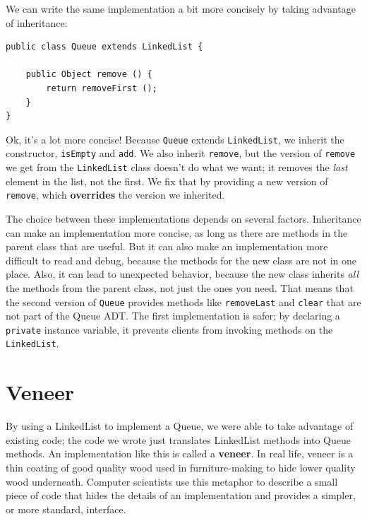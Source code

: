 \documentclass[12pt]{book}
\theoremstyle{exercise}
\begin{document}
We can write the same implementation a bit more concisely by taking
advantage of inheritance:

\begin{verbatim}
public class Queue extends LinkedList {

    public Object remove () {
        return removeFirst ();
    }
}
\end{verbatim}
%
Ok, it's a lot more concise!  Because {\tt Queue} extends {\tt LinkedList},
we inherit the constructor, {\tt isEmpty} and {\tt add}.  We also
inherit {\tt remove}, but the version of {\tt remove} we get from
the {\tt LinkedList} class doesn't do what we want; it removes
the {\em last} element in the list, not the first.  We fix that
by providing a new version of {\tt remove}, which {\bf overrides}
the version we inherited.

The choice between these implementations depends on several factors.
Inheritance can make an implementation more concise, as long as
there are methods in the parent class that are useful.  But it can
also make an implementation more difficult to read and debug, because
the methods for the new class are not in one place.  Also, it can
lead to unexpected behavior, because the new class inherits {\em all}
the methods from the parent class, not just the ones you need.
That means that the second version of {\tt Queue}
provides methods like {\tt removeLast} and {\tt clear} that
are not part of the Queue ADT.
The first implementation is safer;
by declaring a {\tt private}
instance variable, it prevents
clients from invoking methods on the {\tt LinkedList}.



\section{Veneer}

By using a LinkedList to implement a Queue, we were able
to take advantage of existing code; the code we wrote just
translates LinkedList methods into Queue methods.
An implementation like this is called a {\bf veneer}.  In
real life, veneer is a thin coating of good quality wood used
in furniture-making to hide lower quality wood underneath.
Computer scientists use this metaphor to describe a small
piece of code that hides the details of an implementation and
provides a simpler, or more standard, interface.
\end{document}

